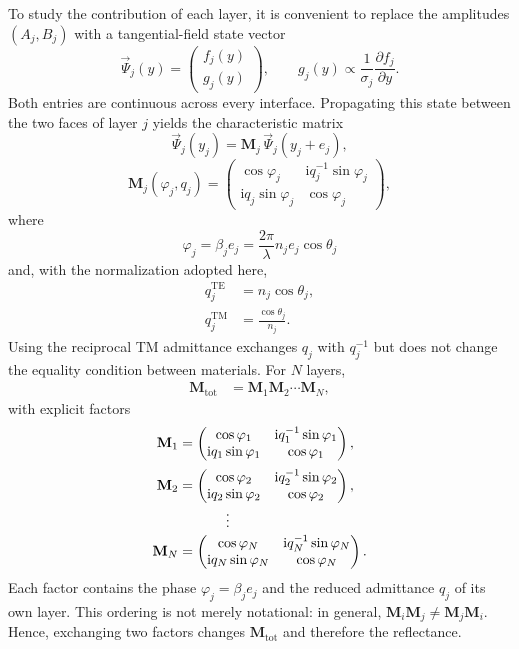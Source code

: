 \documentclass[10pt,a4paper]{article}
\newcommand{\ii}{\mathrm{i}}
\newcommand{\M}{\mathbf{M}}
\newcommand{\vPsi}{\vec{\Psi}}
\begin{document}
To study the contribution of each layer, it is convenient to replace the amplitudes $(A_j,B_j)$ with a tangential-field state vector
\begin{equation}
\vPsi_j(y)=
\begin{pmatrix}
f_j(y)\\[2pt]
g_j(y)
\end{pmatrix},
\qquad
g_j(y)\propto\frac{1}{\sigma_j}\frac{\partial f_j}{\partial y}.
\label{eq:vector-estado}
\end{equation}
Both entries are continuous across every interface. Propagating this state between the two faces of layer $j$ yields the characteristic matrix
\begin{equation}
\vPsi_j(y_j)=\M_j\,\vPsi_j(y_j+e_j),
\end{equation}
\begin{equation}
\M_j(\varphi_j,q_j)=
\begin{pmatrix}
\cos\varphi_j & \ii q_j^{-1}\sin\varphi_j\\[2pt]
\ii q_j\sin\varphi_j & \cos\varphi_j
\end{pmatrix},
\label{eq:matriz-capa}
\end{equation}
where
\begin{equation}
\varphi_j=\beta_j e_j
=\frac{2\pi}{\lambda}n_je_j\cos\theta_j
\label{eq:fase}
\end{equation}
and, with the normalization adopted here,
\begin{align}
q_j^{\mathrm{TE}}&=n_j\cos\theta_j,
\label{eq:qte}\\
q_j^{\mathrm{TM}}&=\frac{\cos\theta_j}{n_j}.
\label{eq:qtm}
\end{align}
Using the reciprocal TM admittance exchanges $q_j$ with $q_j^{-1}$ but does not change the equality condition between materials. For $N$ layers,
\begin{align}
\M_{\mathrm{tot}}
&=\M_1\M_2\cdots\M_N,
\label{eq:producto-total}
\end{align}
with explicit factors
\begin{align*}
\M_1&=
\begin{pmatrix}
\cos\varphi_1 & \ii q_1^{-1}\sin\varphi_1\\
\ii q_1\sin\varphi_1 & \cos\varphi_1
\end{pmatrix},\\[2pt]
\M_2&=
\begin{pmatrix}
\cos\varphi_2 & \ii q_2^{-1}\sin\varphi_2\\
\ii q_2\sin\varphi_2 & \cos\varphi_2
\end{pmatrix},\\[-2pt]
&\hspace{1.2cm}\vdots\\[-2pt]
\M_N&=
\begin{pmatrix}
\cos\varphi_N & \ii q_N^{-1}\sin\varphi_N\\
\ii q_N\sin\varphi_N & \cos\varphi_N
\end{pmatrix}.
\end{align*}
Each factor contains the phase $\varphi_j=\beta_j e_j$ and the reduced admittance
$q_j$ of its own layer. This ordering is not merely notational: in general,
$\M_i\M_j\neq\M_j\M_i$. Hence, exchanging two factors changes
$\M_{\mathrm{tot}}$ and therefore the reflectance.
\end{document}
